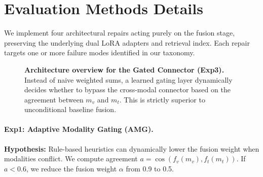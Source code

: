 \documentclass{article}
\begin{document}
\section{Evaluation Methods Details}
\label{app:methods}

We implement four architectural repairs acting purely on the fusion stage, preserving the underlying dual LoRA adapters and retrieval index. Each repair targets one or more failure modes identified in our taxonomy.

\begin{figure}[h]
  \centering
  \caption{\textbf{Architecture overview for the Gated Connector (Exp3).} Instead of naive weighted sums, a learned gating layer dynamically decides whether to bypass the cross-modal connector based on the agreement between $m_v$ and $m_t$. This is strictly superior to unconditional baseline fusion.}
  \label{fig:architecture}
\end{figure}

\paragraph{Exp1: Adaptive Modality Gating (AMG).}
\textbf{Hypothesis:} Rule-based heuristics can dynamically lower the fusion weight when modalities conflict. We compute agreement $a = \cos(f_v(m_v), f_t(m_t))$. If $a < 0.6$, we reduce the fusion weight $\alpha$ from 0.9 to 0.5.
\end{document}
